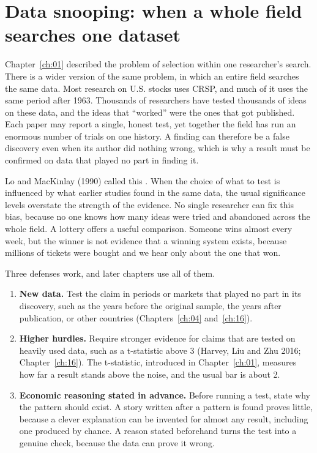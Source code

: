 \section{Data snooping: when a whole field searches one dataset}
\label{sec:02-snooping}

Chapter~\ref{ch:01} described the problem of selection within one researcher's search. There is a wider version of the same problem, in which an entire field searches the same data. Most research on U.S. stocks uses CRSP, and much of it uses the same period after 1963. Thousands of researchers have tested thousands of ideas on these data, and the ideas that ``worked'' were the ones that got published. Each paper may report a single, honest test, yet together the field has run an enormous number of trials on one history. A finding can therefore be a false discovery even when its author did nothing wrong, which is why a result must be confirmed on data that played no part in finding it.

Lo and MacKinlay (1990) called this . When the choice of what to test is influenced by what earlier studies found in the same data, the usual significance levels overstate the strength of the evidence. No single researcher can fix this bias, because no one knows how many ideas were tried and abandoned across the whole field. A lottery offers a useful comparison. Someone wins almost every week, but the winner is not evidence that a winning system exists, because millions of tickets were bought and we hear only about the one that won.

Three defenses work, and later chapters use all of them.

\begin{enumerate}
  \item \textbf{New data.} Test the claim in periods or markets that played no part in its discovery, such as the years before the original sample, the years after publication, or other countries (Chapters~\ref{ch:04} and~\ref{ch:16}).
  \item \textbf{Higher hurdles.} Require stronger evidence for claims that are tested on heavily used data, such as a t-statistic above 3 (Harvey, Liu and Zhu 2016; Chapter~\ref{ch:16}). The t-statistic, introduced in Chapter~\ref{ch:01}, measures how far a result stands above the noise, and the usual bar is about 2.
    \item \textbf{Economic reasoning stated in advance.} Before running a test, state why the pattern should exist. A story written after a pattern is found proves little, because a clever explanation can be invented for almost any result, including one produced by chance. A reason stated beforehand turns the test into a genuine check, because the data can prove it wrong.
\end{enumerate}

